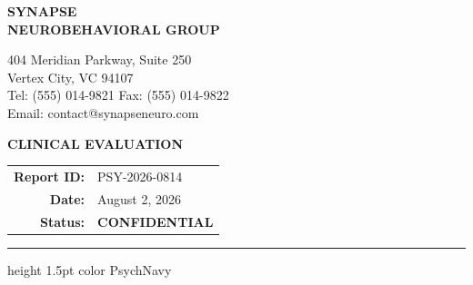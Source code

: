 \documentclass[11pt,letterpaper]{article}
\begin{document}
\noindent
\begin{minipage}[t]{0.64\textwidth}
    {\selectfont\bfseries\Huge\color{PsychNavy} SYNAPSE} \\
    {\selectfont\bfseries\large\color{PsychTeal} NEUROBEHAVIORAL GROUP} \\
    \vspace{0.1cm}
    \begin{small}
        \color{PsychText}
        404 Meridian Parkway, Suite 250 \\
        Vertex City, VC 94107 \\
        Tel: (555) 014-9821 \quad Fax: (555) 014-9822 \\
        Email: contact@synapseneuro.com
    \end{small}
\end{minipage}%
\begin{minipage}[t]{0.36\textwidth}
    \raggedleft
    \vspace{0.1cm}
    {\selectfont\bfseries\Large\color{PsychNavy} CLINICAL EVALUATION} \\
    \vspace{0.2cm}
    \begin{tabular}{rl}
        \textbf{Report ID:} & PSY-2026-0814 \\
        \textbf{Date:}      & August 2, 2026 \\
        \textbf{Status:}    & \color{PsychTeal}\textbf{CONFIDENTIAL}
    \end{tabular}
\end{minipage}

\vspace{0.4cm}
\hrule height 1.5pt color PsychNavy
\vspace{0.4cm}









\clearpage
\nocite{*}


\end{document}
